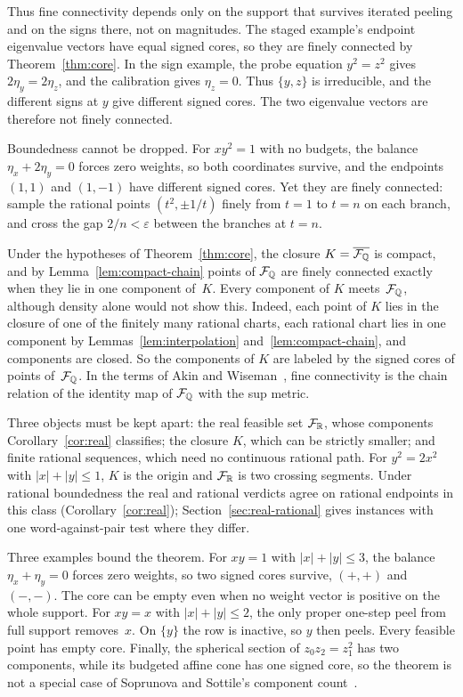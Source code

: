 Thus fine connectivity depends only on the support that survives iterated
peeling and on the signs there, not on magnitudes. The staged example's
endpoint eigenvalue vectors have equal signed cores, so they are finely
connected by Theorem~\ref{thm:core}. In the sign example, the probe
equation $y^2=z^2$ gives $2\eta_y=2\eta_z$, and the calibration gives
$\eta_z=0$. Thus $\{y,z\}$ is irreducible, and the different signs at $y$
give different signed cores. The two eigenvalue vectors are therefore not
finely connected.

Boundedness cannot be dropped. For $xy^2=1$ with no budgets, the balance
$\eta_x+2\eta_y=0$ forces zero weights, so both coordinates survive, and
the endpoints $(1,1)$ and $(1,-1)$ have different signed cores. Yet they
are finely connected: sample the rational points $(t^2,\pm1/t)$ finely
from $t=1$ to $t=n$ on each branch, and cross the gap $2/n<\varepsilon$
between the branches at $t=n$.

\begin{remark}\label{rem:closure}
Under the hypotheses of Theorem~\ref{thm:core}, the closure
$K=\overline{\mathcal F_{\mathbb{Q}}}$ is compact, and by Lemma~\ref{lem:compact-chain} points
of $\mathcal F_{\mathbb{Q}}$ are finely connected exactly when they lie in one component
of~$K$. Every component of $K$ meets~$\mathcal F_{\mathbb{Q}}$, although density alone would
not show this. Indeed, each point of $K$ lies in the closure of one of the
finitely many rational charts, each rational chart lies in one component
by Lemmas~\ref{lem:interpolation} and~\ref{lem:compact-chain}, and
components are closed. So the components of $K$ are labeled by the signed
cores of points of~$\mathcal F_{\mathbb{Q}}$. In the terms of Akin and
Wiseman~\cite[Section~3]{akinwiseman}, fine connectivity is the chain
relation of the identity map of $\mathcal F_{\mathbb{Q}}$ with the sup metric.
\end{remark}

Three objects must be kept apart: the real feasible set $\mathcal F_{\mathbb{R}}$, whose
components Corollary~\ref{cor:real} classifies; the closure $K$, which can
be strictly smaller; and finite rational sequences, which need no
continuous rational path. For $y^2=2x^2$ with $|x|+|y|\le1$, $K$ is the
origin and $\mathcal F_{\mathbb{R}}$ is two crossing segments. Under rational boundedness the
real and rational verdicts agree on rational endpoints in this class
(Corollary~\ref{cor:real}); Section~\ref{sec:real-rational} gives
instances with one word-against-pair test where they differ.

Three examples bound the theorem. For $xy=1$ with $|x|+|y|\le3$, the
balance $\eta_x+\eta_y=0$ forces zero weights, so two signed cores
survive, $(+,+)$ and $(-,-)$. The core can be empty even when no weight
vector is positive on the whole support. For $xy=x$ with $|x|+|y|\le2$,
the only proper one-step peel from full support removes~$x$. On $\{y\}$
the row is inactive, so $y$ then peels. Every feasible point has empty
core. Finally, the spherical section of $z_0z_2=z_1^2$ has two components,
while its budgeted affine cone has one signed core, so the theorem is not a
special case of Soprunova and Sottile's component
count~\cite[Theorem~2.4(2)]{soprunovasottile}.

